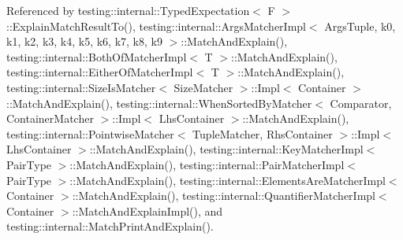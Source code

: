 Referenced by testing\+::internal\+::\+Typed\+Expectation$<$ F $>$\+::\+Explain\+Match\+Result\+To(), testing\+::internal\+::\+Args\+Matcher\+Impl$<$ Args\+Tuple, k0, k1, k2, k3, k4, k5, k6, k7, k8, k9 $>$\+::\+Match\+And\+Explain(), testing\+::internal\+::\+Both\+Of\+Matcher\+Impl$<$ T $>$\+::\+Match\+And\+Explain(), testing\+::internal\+::\+Either\+Of\+Matcher\+Impl$<$ T $>$\+::\+Match\+And\+Explain(), testing\+::internal\+::\+Size\+Is\+Matcher$<$ Size\+Matcher $>$\+::\+Impl$<$ Container $>$\+::\+Match\+And\+Explain(), testing\+::internal\+::\+When\+Sorted\+By\+Matcher$<$ Comparator, Container\+Matcher $>$\+::\+Impl$<$ Lhs\+Container $>$\+::\+Match\+And\+Explain(), testing\+::internal\+::\+Pointwise\+Matcher$<$ Tuple\+Matcher, Rhs\+Container $>$\+::\+Impl$<$ Lhs\+Container $>$\+::\+Match\+And\+Explain(), testing\+::internal\+::\+Key\+Matcher\+Impl$<$ Pair\+Type $>$\+::\+Match\+And\+Explain(), testing\+::internal\+::\+Pair\+Matcher\+Impl$<$ Pair\+Type $>$\+::\+Match\+And\+Explain(), testing\+::internal\+::\+Elements\+Are\+Matcher\+Impl$<$ Container $>$\+::\+Match\+And\+Explain(), testing\+::internal\+::\+Quantifier\+Matcher\+Impl$<$ Container $>$\+::\+Match\+And\+Explain\+Impl(), and testing\+::internal\+::\+Match\+Print\+And\+Explain().


